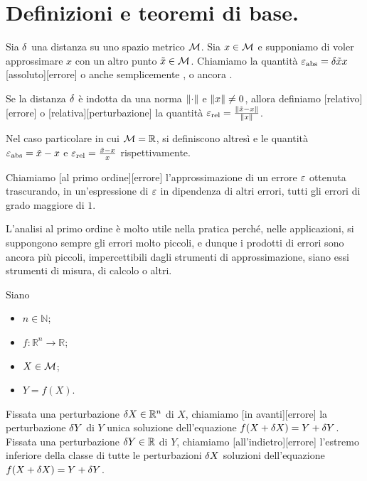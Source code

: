 \section{Definizioni e teoremi di base.}
\label{AnalisiDegliErrori_DefinizioniETeoremiDiBase}
\begin{Definition}
  Sia $\delta$ una distanza su uno spazio metrico $\mathcal{M}$.
	Sia $x \in \mathcal{M}$ e supponiamo di voler approssimare $x$ con un altro
  punto $\tilde{x} \in \mathcal{M}$.
  Chiamiamo la quantit\`a $\varepsilon_\text{abs} = \delta{\tilde{x}}{x}$
  [assoluto][errore]
  o anche semplicemente
  ,
  o ancora
  .
	\par Se la distanza $\delta$ \`e indotta da una norma $\Norm{\cdot}$
  e $\Norm{x} \neq 0$, allora definiamo
  [relativo][errore]
  o
  [relativa][perturbazione]
  la quantit\`a
  $\RelativeError = \frac{\Norm{\tilde{x} - x}}{\Norm{x}}$.
  \par Nel caso particolare in cui
  $\mathcal{M} = \mathbb{R}$, si definiscono altres\`i
   e  le quantit\`a
  $\varepsilon_\text{abs} = \tilde{x} - x$
  e
  $\varepsilon_\text{rel} = \frac{\tilde{x} - x}{x}$
  rispettivamente.
\end{Definition}
\begin{Definition}
  Chiamiamo
  [al primo ordine][errore]
  l'approssimazione di un errore $\varepsilon$ ottenuta trascurando,
  in un'espressione di $\varepsilon$ in dipendenza di altri errori,
  tutti gli errori di grado maggiore di $1$.
\end{Definition}
\par L'analisi al primo ordine \`e molto utile nella pratica perch\'e, nelle
applicazioni, si suppongono sempre gli errori molto piccoli, e dunque i prodotti
di errori sono ancora pi\`u piccoli, impercettibili dagli strumenti di
approssimazione, siano essi strumenti di misura, di calcolo o altri.
\begin{Definition}
  Siano
  \begin{itemize}
    \item $n \in \mathbb{N}$;
    \item $f: \mathbb{R}^n \rightarrow \mathbb{R}$;
    \item $X \in \mathcal{M}$;
    \item $Y = f(X)$.
  \end{itemize}
  Fissata una perturbazione $\Perturbation{X} \in \mathbb{R}^n$ di $X$,
  chiamiamo
  [in avanti][errore]
  la perturbazione $\Perturbation{Y}$ di $Y$ unica soluzione dell'equazione
  $f(X + \Perturbation{X}) = Y + \Perturbation{Y}$.
  Fissata una perturbazione $\Perturbation{Y} \in \mathbb{R}$ di $Y$,
  chiamiamo
  [all'indietro][errore]
  l'estremo inferiore della classe di tutte le perturbazioni
  $\Perturbation{X}$ soluzioni dell'equazione
  $f(X + \Perturbation{X}) = Y + \Perturbation{Y}$.
\end{Definition}
